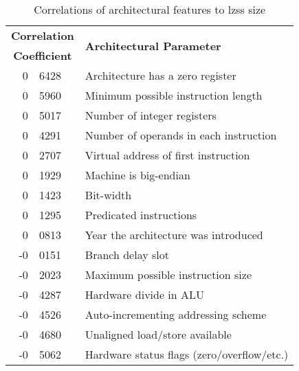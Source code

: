 \begin{table}[tbp]
\caption{Correlations of architectural features to lzss size}
\label{table:lzss_correlations}
\begin{sf} 
\begin{center}
\begin{tabular}{|r@{.\hspace{0.025em}}l|l|}
\hline
\multicolumn{2}{|c|}{\bf Correlation} & \multirow{2}{*}{\bf Architectural Parameter}\\
\multicolumn{2}{|c|}{\bf Coefficient} & \\
\hline
\hline

 0 & 6428	& Architecture has a zero register \\
 0 & 5960	& Minimum possible instruction length \\
 0 & 5017	& Number of integer registers \\
 0 & 4291	& Number of operands in each instruction \\
 0 & 2707	& Virtual address of first instruction \\ 
 0 & 1929	& Machine is big-endian \\
 0 & 1423	& Bit-width \\
 0 & 1295	& Predicated instructions \\
 0 & 0813	& Year the architecture was introduced \\
 \hline
-0 & 0151	& Branch delay slot \\
-0 & 2023	& Maximum possible instruction size  \\
-0 & 4287	& Hardware divide in ALU \\
-0 & 4526	& Auto-incrementing addressing scheme \\
-0 & 4680	& Unaligned load/store available \\
-0 & 5062	& Hardware status flags (zero/overflow/etc.) \\

\hline
\end{tabular}
\end{center}
\end{sf}


%
\end{table}
